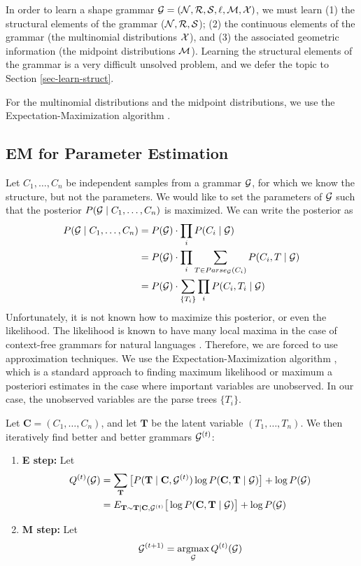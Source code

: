 

In order to learn a shape grammar ${\mathcal G} =
({\mathcal N},{\mathcal R},{\mathcal S},\ell,{\mathcal M},{\mathcal X})$, we must learn (1) the structural
elements of the grammar (${\mathcal N}, {\mathcal R}, {\mathcal S}$); (2) the continuous
elements of the grammar (the multinomial distributions ${\mathcal X}$), and
(3) the associated geometric information (the midpoint distributions
${\mathcal M}$). Learning the structural elements of the grammar is a very
difficult unsolved problem, and we defer the topic to Section
\ref{sec-learn-struct}.

For the multinomial distributions and the midpoint distributions, we
use the Expectation-Maximization algorithm \cite{em}.  

\subsection{EM for Parameter Estimation}

Let $C_1,\dots, C_n$ be independent samples from a grammar ${\mathcal G}$, for
which we know the structure, but not the parameters. We would like to
set the parameters of ${\mathcal G}$ such that the posterior $P({\mathcal G}\mid
C_1,\dots,C_n)$ is maximized. We can write the posterior as
\begin{align*}
  P({\mathcal G}\mid C_1,\dots, C_n) &= P({\mathcal G}) \cdot \prod_i P(C_i\mid {\mathcal G})\\
  &= P({\mathcal G}) \cdot \prod_i \sum_{T\in Parse_{{\mathcal G}}(C_i)}P(C_i, T \mid {\mathcal G})\\
  &= P({\mathcal G}) \cdot \sum_{\{T_i\}}\prod_i P(C_i, T_i \mid {\mathcal G})\\
\end{align*}
Unfortunately, it is not known how to maximize this posterior, or even
the likelihood. The likelihood is known to have many local maxima in
the case of context-free grammars for natural languages
\cite{charniak}. Therefore, we are forced to use approximation
techniques. We use the Expectation-Maximization algorithm \cite{em},
which is a standard approach to finding maximum likelihood or maximum
a posteriori estimates in the case where important variables are
unobserved. In our case, the unobserved variables are the parse trees
$\{T_i\}$.

Let $\mathbf{C} = (C_1,\dots,C_n)$, and let $\mathbf{T}$ be the latent
variable $(T_1,\dots,T_n)$. We then iteratively find better and better
grammars ${\mathcal G}^{(t)}$:
\begin{enumerate}
\item \textbf{E step:} Let 
  \begin{align*}
Q^{(t)}({\mathcal G}) &= \sum_{\mathbf{T}} \big[P(\mathbf{T}\mid \mathbf{C},
{\mathcal G}^{(t)}) \log P(\mathbf{C},\mathbf{T}\mid {\mathcal G}) \big] + \log
P({\mathcal G})\\
&= E_{\mathbf{T} \sim \mathbf{T} | \mathbf{C}, {\mathcal G}^{(t)}}\big[\log
P(\mathbf{C},\mathbf{T}\mid {\mathcal G}) \big] + \log P({\mathcal G})
  \end{align*}
\item \textbf{M step:} Let
$$ {\mathcal G}^{(t+1)} = \operatorname*{argmax}_{{\mathcal G}} Q^{(t)}({\mathcal G})$$
\end{enumerate}

